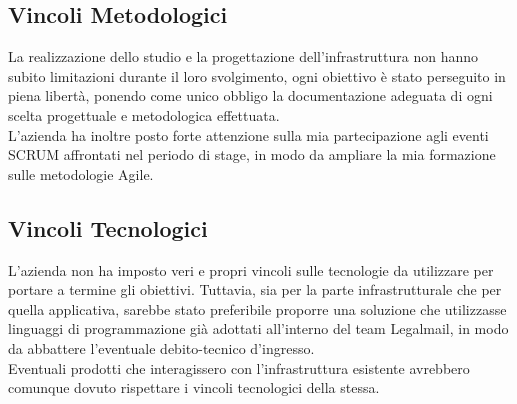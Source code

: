 \subsection{Vincoli Metodologici}
La realizzazione dello studio e la progettazione dell'infrastruttura non hanno subito limitazioni durante il loro svolgimento, ogni obiettivo è stato perseguito in piena libertà, ponendo come unico obbligo la documentazione adeguata di ogni scelta progettuale e metodologica effettuata. \\
L'azienda ha inoltre posto forte attenzione sulla mia partecipazione agli eventi SCRUM affrontati nel periodo di stage, in modo da ampliare la mia formazione sulle metodologie Agile.
\subsection{Vincoli Tecnologici}
L'azienda non ha imposto veri e propri vincoli sulle tecnologie da utilizzare per portare a termine gli obiettivi. Tuttavia, sia per la parte infrastrutturale che per quella applicativa, sarebbe stato preferibile proporre una soluzione che utilizzasse linguaggi di programmazione già adottati all'interno del team Legalmail, in modo da abbattere l'eventuale \gls{debito-tecnico} d'ingresso. \\
Eventuali prodotti che interagissero con l'infrastruttura esistente avrebbero comunque dovuto rispettare i vincoli tecnologici della stessa. 
